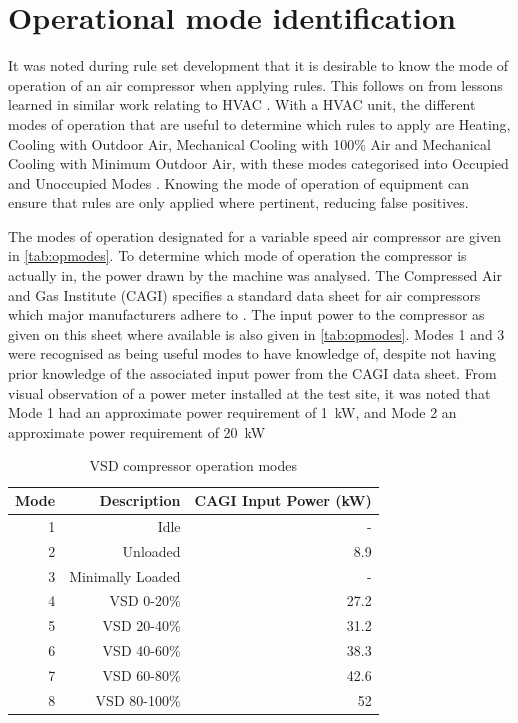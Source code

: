 \lipsum[1-10]

\section{Operational mode identification}
\label{sec:modeidentification}
It was noted during rule set development that it is desirable to know the mode of operation of an air compressor when applying rules. This follows on from lessons learned in similar work relating to HVAC \cite{Bruton2014}. With a HVAC unit, the different modes of operation that are useful to determine which rules to apply are Heating, Cooling with Outdoor Air, Mechanical Cooling with 100\% Air and Mechanical Cooling with Minimum Outdoor Air, with these modes categorised into Occupied and Unoccupied Modes \cite{House2001}. Knowing the mode of operation of equipment can ensure that rules are only applied where pertinent, reducing false positives.

The modes of operation designated for a variable speed air compressor are given in \autoref{tab:opmodes}. To determine which mode of operation the compressor is actually in, the power drawn by the machine was analysed. The Compressed Air and Gas Institute (CAGI) specifies a standard data sheet for air compressors which major manufacturers adhere to \cite{CAGI}. The input power to the compressor as given on this sheet where available is also given in \autoref{tab:opmodes}. Modes 1 and 3 were recognised as being useful modes to have knowledge of, despite not having prior knowledge of the associated input power from the CAGI data sheet. From visual observation of a power meter installed at the test site, it was noted that Mode 1 had an approximate power requirement of \SI{1}{\kilo \watt}, and Mode 2 an approximate power requirement of \SI{20}{\kilo \watt}

\begin{table}[htbp]
  \centering
  \caption{VSD compressor operation modes}
    \begin{tabular}{rrr}
    \toprule
    Mode  & Description & CAGI Input Power (kW)\\
    \midrule
    1     & Idle & -\\
    2     & Unloaded & 8.9 \\
    3     & Minimally Loaded & - \\
    4     & VSD 0-20\% & 27.2 \\
    5     & VSD 20-40\% & 31.2 \\
    6     & VSD 40-60\% & 38.3\\
    7     & VSD 60-80\% & 42.6 \\
    8     & VSD 80-100\% & 52\\
    \bottomrule
    \end{tabular}%
  \label{tab:opmodes}%
\end{table}%

